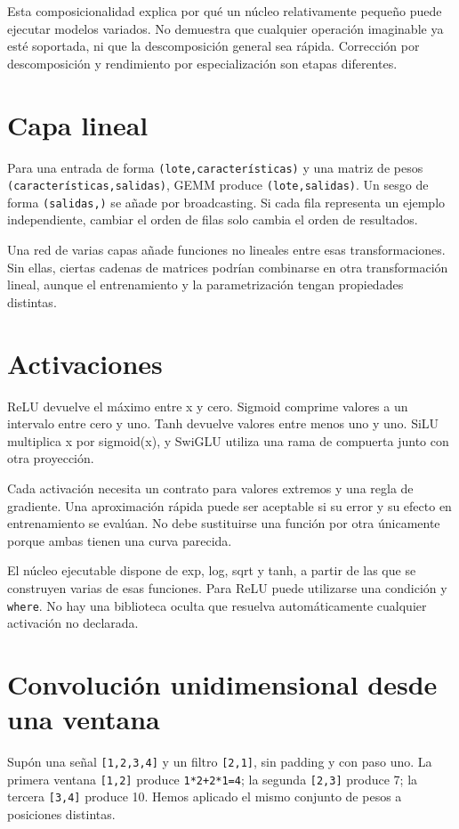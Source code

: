 \documentclass[12pt,a4paper,oneside]{report}
\begin{document}
Esta composicionalidad explica por qué un núcleo relativamente pequeño puede ejecutar modelos variados. No demuestra que cualquier operación imaginable ya esté soportada, ni que la descomposición general sea rápida. Corrección por descomposición y rendimiento por especialización son etapas diferentes.

\section{Capa lineal}
Para una entrada de forma \texttt{(lote,caract\allowbreak{}erísticas)} y una matriz de pesos \texttt{(característ\allowbreak{}icas,salidas\allowbreak{})}, GEMM produce \texttt{(lote,salidas)}. Un sesgo de forma \texttt{(salidas,)} se añade por broadcasting. Si cada fila representa un ejemplo independiente, cambiar el orden de filas solo cambia el orden de resultados.

Una red de varias capas añade funciones no lineales entre esas transformaciones. Sin ellas, ciertas cadenas de matrices podrían combinarse en otra transformación lineal, aunque el entrenamiento y la parametrización tengan propiedades distintas.

\section{Activaciones}
ReLU devuelve el máximo entre x y cero. Sigmoid comprime valores a un intervalo entre cero y uno. Tanh devuelve valores entre menos uno y uno. SiLU multiplica x por sigmoid(x), y SwiGLU utiliza una rama de compuerta junto con otra proyección.

Cada activación necesita un contrato para valores extremos y una regla de gradiente. Una aproximación rápida puede ser aceptable si su error y su efecto en entrenamiento se evalúan. No debe sustituirse una función por otra únicamente porque ambas tienen una curva parecida.

El núcleo ejecutable dispone de exp, log, sqrt y tanh, a partir de las que se construyen varias de esas funciones. Para ReLU puede utilizarse una condición y \texttt{where}. No hay una biblioteca oculta que resuelva automáticamente cualquier activación no declarada.

\section{Convolución unidimensional desde una ventana}
Supón una señal \texttt{[1,2,3,4]} y un filtro \texttt{[2,1]}, sin padding y con paso uno. La primera ventana \texttt{[1,2]} produce \texttt{1*2+2*1=4}; la segunda \texttt{[2,3]} produce 7; la tercera \texttt{[3,4]} produce 10. Hemos aplicado el mismo conjunto de pesos a posiciones distintas.
\end{document}
